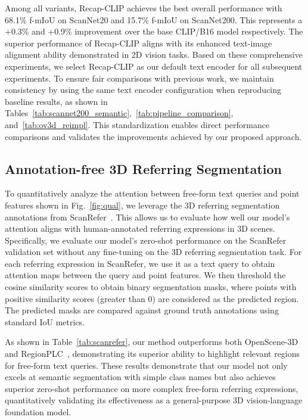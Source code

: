 Among all variants, Recap-CLIP achieves the best overall performance with 68.1\% f-mIoU on ScanNet20 and 15.7\% f-mIoU on ScanNet200. 
This represents a +0.3\% and +0.9\% improvement over the base CLIP/B16 model respectively. 
The superior performance of Recap-CLIP aligns with its enhanced text-image alignment ability demonstrated in 2D vision tasks.
Based on these comprehensive experiments, we select Recap-CLIP as our default text encoder for all subsequent experiments. To ensure fair comparisons with previous work, we maintain consistency by using the same text encoder configuration when reproducing baseline results, as shown in Tables~\ref{tab:scannet200_semantic},~\ref{tab:pipeline_comparison}, and~\ref{tab:ov3d_reimpl}. This standardization enables direct performance comparisons and validates the improvements achieved by our proposed approach.




\subsection{Annotation-free 3D Referring Segmentation}
To quantitatively analyze the attention between free-form text queries and point features shown in Fig.~\ref{fig:qual}, we leverage the 3D referring segmentation annotations from ScanRefer~\cite{chen2020scanrefer}. 
This allows us to evaluate how well our model's attention aligns with human-annotated referring expressions in 3D scenes.
Specifically, we evaluate our model's zero-shot performance on the ScanRefer validation set without any fine-tuning on the 3D referring segmentation task.
For each referring expression in ScanRefer, we use it as a text query to obtain attention maps between the query and point features.
We then threshold the cosine similarity scores to obtain binary segmentation masks, where points with positive similarity scores (greater than 0) are considered as the predicted region.
The predicted masks are compared against ground truth annotations using standard IoU metrics.

As shown in Table~\ref{tab:scanrefer}, our method outperforms both OpenScene-3D~\cite{Peng2023OpenScene} and RegionPLC~\cite{yang2024regionplc}, demonstrating its superior ability to highlight relevant regions for free-form text queries.
These results demonstrate that our model not only excels at semantic segmentation with simple class names but also achieves superior zero-shot performance on more complex free-form referring expressions, quantitatively validating its effectiveness as a general-purpose 3D vision-language foundation model.


